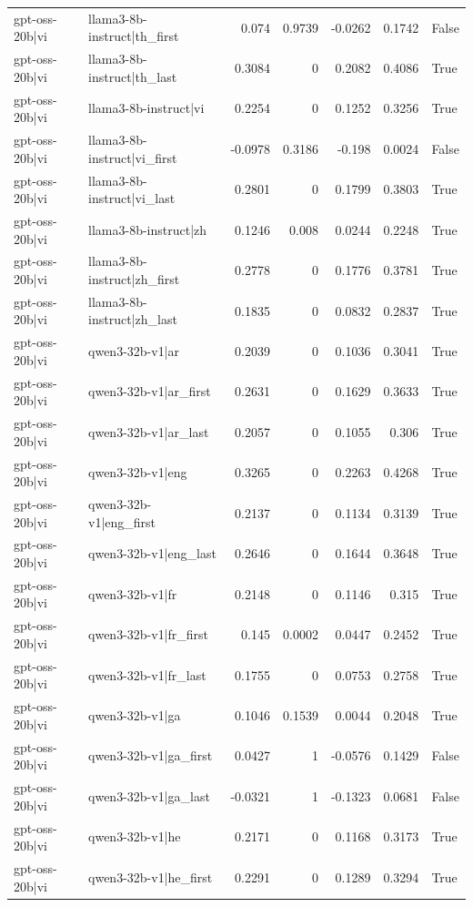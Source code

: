 \begin{table}
\begin{tabular}{l l r r r r l}
gpt-oss-20b|vi & llama3-8b-instruct|th_first & 0.074 & 0.9739 & -0.0262 & 0.1742 & False \\
gpt-oss-20b|vi & llama3-8b-instruct|th_last & 0.3084 & 0 & 0.2082 & 0.4086 & True \\
gpt-oss-20b|vi & llama3-8b-instruct|vi & 0.2254 & 0 & 0.1252 & 0.3256 & True \\
gpt-oss-20b|vi & llama3-8b-instruct|vi_first & -0.0978 & 0.3186 & -0.198 & 0.0024 & False \\
gpt-oss-20b|vi & llama3-8b-instruct|vi_last & 0.2801 & 0 & 0.1799 & 0.3803 & True \\
gpt-oss-20b|vi & llama3-8b-instruct|zh & 0.1246 & 0.008 & 0.0244 & 0.2248 & True \\
gpt-oss-20b|vi & llama3-8b-instruct|zh_first & 0.2778 & 0 & 0.1776 & 0.3781 & True \\
gpt-oss-20b|vi & llama3-8b-instruct|zh_last & 0.1835 & 0 & 0.0832 & 0.2837 & True \\
gpt-oss-20b|vi & qwen3-32b-v1|ar & 0.2039 & 0 & 0.1036 & 0.3041 & True \\
gpt-oss-20b|vi & qwen3-32b-v1|ar_first & 0.2631 & 0 & 0.1629 & 0.3633 & True \\
gpt-oss-20b|vi & qwen3-32b-v1|ar_last & 0.2057 & 0 & 0.1055 & 0.306 & True \\
gpt-oss-20b|vi & qwen3-32b-v1|eng & 0.3265 & 0 & 0.2263 & 0.4268 & True \\
gpt-oss-20b|vi & qwen3-32b-v1|eng_first & 0.2137 & 0 & 0.1134 & 0.3139 & True \\
gpt-oss-20b|vi & qwen3-32b-v1|eng_last & 0.2646 & 0 & 0.1644 & 0.3648 & True \\
gpt-oss-20b|vi & qwen3-32b-v1|fr & 0.2148 & 0 & 0.1146 & 0.315 & True \\
gpt-oss-20b|vi & qwen3-32b-v1|fr_first & 0.145 & 0.0002 & 0.0447 & 0.2452 & True \\
gpt-oss-20b|vi & qwen3-32b-v1|fr_last & 0.1755 & 0 & 0.0753 & 0.2758 & True \\
gpt-oss-20b|vi & qwen3-32b-v1|ga & 0.1046 & 0.1539 & 0.0044 & 0.2048 & True \\
gpt-oss-20b|vi & qwen3-32b-v1|ga_first & 0.0427 & 1 & -0.0576 & 0.1429 & False \\
gpt-oss-20b|vi & qwen3-32b-v1|ga_last & -0.0321 & 1 & -0.1323 & 0.0681 & False \\
gpt-oss-20b|vi & qwen3-32b-v1|he & 0.2171 & 0 & 0.1168 & 0.3173 & True \\
gpt-oss-20b|vi & qwen3-32b-v1|he_first & 0.2291 & 0 & 0.1289 & 0.3294 & True \\

\end{tabular}
\end{table}
